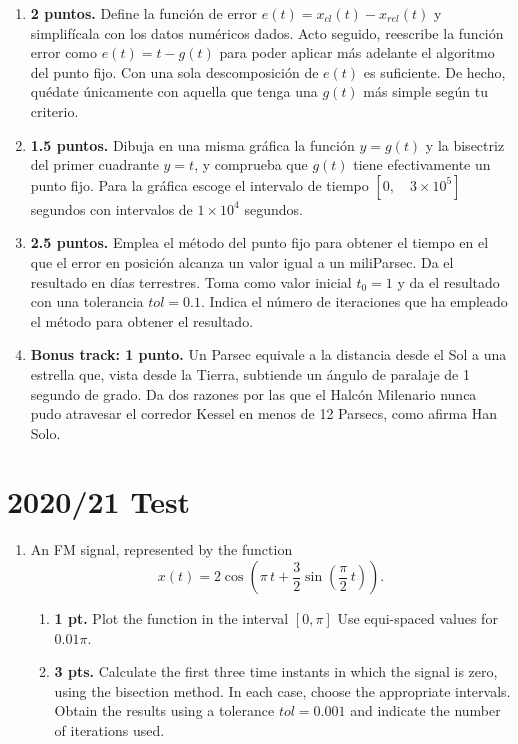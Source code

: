 \begin{paracol}{2}
\begin{enumerate}
\begin{enumerate}
	\item {\bf 2 puntos.} Define la función de error $e(t) = x_{cl}(t) - x_{rel}(t)$ y simplifícala con los datos numéricos dados. Acto seguido, reescribe la función error como $e(t) = t - g(t)$ para poder aplicar más adelante el algoritmo del punto fijo. Con una sola descomposición de $e(t)$ es suficiente. De hecho, quédate únicamente con aquella que tenga una $g(t)$ más simple según tu criterio.

	\item {\bf 1.5 puntos.} Dibuja en una misma gráfica la función $y = g(t)$ y la bisectriz del primer cuadrante $y = t$, y comprueba que $g(t)$ tiene efectivamente un punto fijo. Para la gráfica escoge el intervalo de tiempo $[0, \quad 3 \times 10^5]$ segundos con intervalos de $1\times 10^4$ segundos.
	\item {\bf 2.5 puntos.} Emplea el método del punto fijo para obtener el tiempo en el que el error en posición alcanza un valor igual a un miliParsec. Da el resultado en días terrestres. Toma como valor inicial $t_0 = 1$ y da el resultado con una tolerancia $tol = 0.1$. Indica el número de iteraciones que ha empleado el método para obtener el resultado.
	\item {\bf Bonus track: 1 punto.} Un Parsec equivale a la distancia desde el Sol a una estrella que, vista desde la Tierra, subtiende un ángulo de paralaje de 1 segundo de grado. Da dos razones por las que el Halcón Milenario nunca pudo atravesar el corredor Kessel en menos de 12 Parsecs, como afirma Han Solo.

\end{enumerate}
\end{enumerate}
\switchcolumn
\section{2020/21 Test}
\begin{enumerate}
\item An FM signal, represented by the function
\begin{equation}
	x(t) = 2\cos\left(\pi \, t+ \frac{3}{2}\sin\left(\frac{\pi}{2} \, t\right)\right).
\end{equation}
\begin{enumerate}
	\item \textbf{1 pt.} Plot the function in the interval $[0,\pi]$ Use equi-spaced values for $0.01\pi$.
	
    \item \textbf{3 pts. } Calculate the first three time instants in which the signal is zero, using the bisection method. In each case, choose the appropriate intervals. Obtain the results using a tolerance $tol=0.001$ and indicate the number of iterations used.
\end{enumerate}


\end{enumerate}
\end{paracol}
